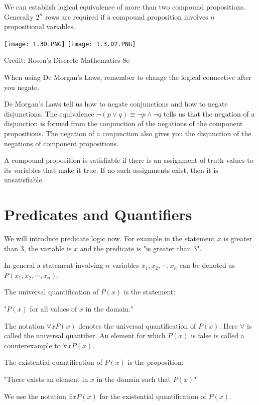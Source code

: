 \documentclass[../discrete.tex]{subfiles}
\begin{document}
We can establish logical equivalence of more than two compound propositions. Generally $2^n$ 
rows are required if a compound proposition involves $n$ propositional variables.
\begin{center}
    \texttt{[image: 1.3D.PNG]}
    \texttt{[image: 1.3.D2.PNG]}

\end{center}
Credit: Rosen's Discrete Mathematics 8e

When using De Morgan's Laws, remember to change the logical connective after you negate. 

De Morgan's Laws tell us how to negate conjunctions and how to negate disjunctions. 
The equivalence $\neg(p\lor q)\equiv \neg p \land \neg q$ tells us that the negation of a disjunction 
is formed from the conjunction of the negations of the component propositions. The negation of a conjunction 
also gives you the disjunction of the negations of component propositions.

A compound proposition is satisfiable if there is an assignment of truth values to its variables that make it true. 
If no such assignments exist, then it is unsatisfiable. 

\section{Predicates and Quantifiers}
We will introduce predicate logic now. For example in the statement $x$ is greater than 3, the variable is $x$ and 
the predicate is "is greater than 3".

In general a statement involving $n$ variables $x_1,x_2,\cdots,x_n$ can be denoted as $P(x_1,x_2,\cdots,x_n)$. 

\begin{definition}
    The universal quantification of $P(x)$ is the statement:

    "$P(x)$ for all values of $x$ in the domain."

    The notation $\forall x P(x)$ denotes the universal quantification of $P(x)$. Here $\forall$ 
    is called the universal quantifier. An element for which $P(x)$ is false is called a counterexample to $\forall x P(x)$.
\end{definition}

\begin{definition}
    The existential quantification of $P(x)$ is the proposition:

    "There exists an element in $x$ in the domain such that $P(x)$"

    We use the notation $\exists x P(x)$ for the existential quantification of $P(x)$.
\end{definition}
\end{document}
